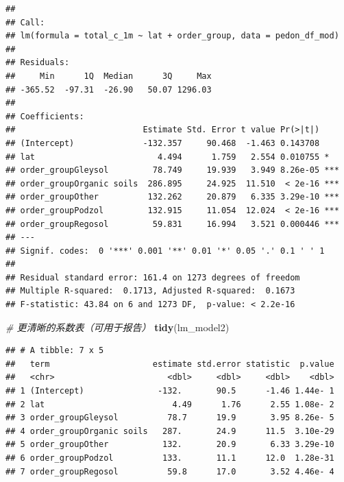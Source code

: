 \documentclass[
]{article}
\newenvironment{Shaded}{\begin{snugshade}}{\end{snugshade}}
\newcommand{\CommentTok}[1]{\textcolor[rgb]{0.56,0.35,0.01}{\textit{#1}}}
\newcommand{\FunctionTok}[1]{\textcolor[rgb]{0.13,0.29,0.53}{\textbf{#1}}}
\newcommand{\NormalTok}[1]{#1}
\begin{document}
\begin{verbatim}
## 
## Call:
## lm(formula = total_c_1m ~ lat + order_group, data = pedon_df_mod)
## 
## Residuals:
##     Min      1Q  Median      3Q     Max 
## -365.52  -97.31  -26.90   50.07 1296.03 
## 
## Coefficients:
##                          Estimate Std. Error t value Pr(>|t|)    
## (Intercept)              -132.357     90.468  -1.463 0.143708    
## lat                         4.494      1.759   2.554 0.010755 *  
## order_groupGleysol         78.749     19.939   3.949 8.26e-05 ***
## order_groupOrganic soils  286.895     24.925  11.510  < 2e-16 ***
## order_groupOther          132.262     20.879   6.335 3.29e-10 ***
## order_groupPodzol         132.915     11.054  12.024  < 2e-16 ***
## order_groupRegosol         59.831     16.994   3.521 0.000446 ***
## ---
## Signif. codes:  0 '***' 0.001 '**' 0.01 '*' 0.05 '.' 0.1 ' ' 1
## 
## Residual standard error: 161.4 on 1273 degrees of freedom
## Multiple R-squared:  0.1713, Adjusted R-squared:  0.1673 
## F-statistic: 43.84 on 6 and 1273 DF,  p-value: < 2.2e-16
\end{verbatim}

\begin{Shaded}
\begin{Highlighting}[]
\CommentTok{\# 更清晰的系数表（可用于报告）}
\FunctionTok{tidy}\NormalTok{(lm\_model2)}
\end{Highlighting}
\end{Shaded}

\begin{verbatim}
## # A tibble: 7 x 5
##   term                     estimate std.error statistic  p.value
##   <chr>                       <dbl>     <dbl>     <dbl>    <dbl>
## 1 (Intercept)               -132.       90.5      -1.46 1.44e- 1
## 2 lat                          4.49      1.76      2.55 1.08e- 2
## 3 order_groupGleysol          78.7      19.9       3.95 8.26e- 5
## 4 order_groupOrganic soils   287.       24.9      11.5  3.10e-29
## 5 order_groupOther           132.       20.9       6.33 3.29e-10
## 6 order_groupPodzol          133.       11.1      12.0  1.28e-31
## 7 order_groupRegosol          59.8      17.0       3.52 4.46e- 4
\end{verbatim}
\end{document}
